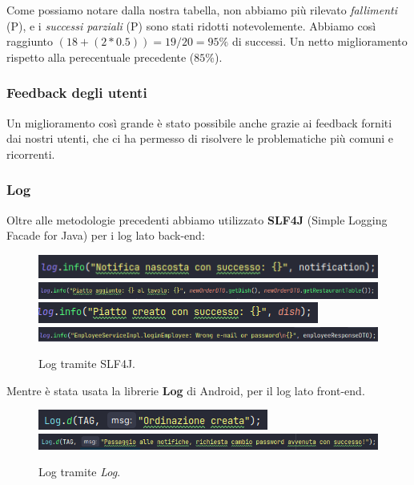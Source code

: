 Come possiamo notare dalla nostra tabella, non abbiamo più rilevato \textit{fallimenti} (P), e i \textit{successi parziali} (P) sono stati ridotti notevolemente. Abbiamo così raggiunto $(18+(2*0.5))=19/20=95\%$ di successi. Un netto miglioramento rispetto alla perecentuale precedente ($85\%$).
\subsubsection{Feedback degli utenti}
Un miglioramento così grande è stato possibile anche grazie ai feedback forniti dai nostri utenti, che ci ha permesso di risolvere le problematiche più comuni e ricorrenti.
\newpage
\subsubsection{Log}
Oltre alle metodologie precedenti abbiamo utilizzato \textbf{SLF4J} (Simple Logging Facade for Java) per i log lato back-end:
\begin{figure}[H]
  \centering
  \includegraphics[scale=0.8]{img/log/logBack1.png}
  \includegraphics[scale=0.8]{img/log/logBack2.png}
  \includegraphics[scale=0.8]{img/log/logBack3.png}
  \includegraphics[scale=0.8]{img/log/logBack4.png}
  \caption{Log tramite SLF4J.}
\end{figure}
Mentre è stata usata la librerie \textbf{Log} di Android, per il log lato front-end.
\begin{figure}[H]
  \centering
  \includegraphics[scale=0.8]{img/log/logFront1.png}
  \includegraphics[scale=0.8]{img/log/logFront2.png}
  \caption{Log tramite \textit{Log}.}
\end{figure}